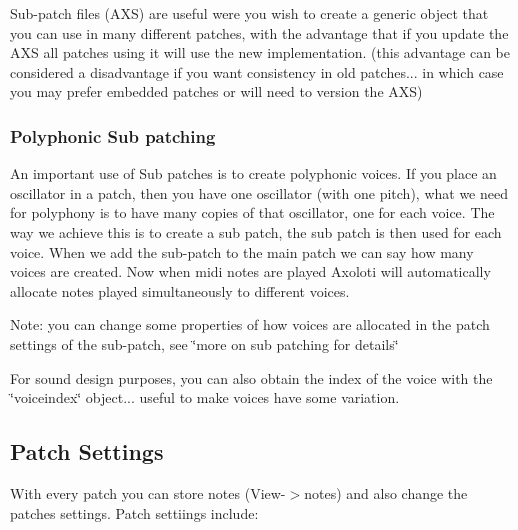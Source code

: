 Sub-\/patch files (A\+XS) are useful were you wish to create a generic object that you can use in many different patches, with the advantage that if you update the A\+XS all patches using it will use the new implementation. (this \textquotesingle{}advantage\textquotesingle{} can be considered a disadvantage if you want consistency in old patches... in which case you may prefer embedded patches or will need to version the A\+XS) \hypertarget{axo_gui_axo_gui_axoloti_edit_mode_patch_subpatch_poly}{}\subsubsection{Polyphonic Sub patching}\label{axo_gui_axo_gui_axoloti_edit_mode_patch_subpatch_poly}
An important use of Sub patches is to create polyphonic voices. If you place an oscillator in a patch, then you have one oscillator (with one pitch), what we need for polyphony is to have many copies of that oscillator, one for each voice. The way we achieve this is to create a sub patch, the sub patch is then used for each voice. When we add the sub-\/patch to the main patch we can say how many voices are created. Now when midi notes are played Axoloti will automatically allocate notes played simultaneously to different voices. 

Note\+: you can change some properties of how voices are allocated in the patch settings of the sub-\/patch, see \char`\"{}more on sub patching for details\char`\"{}

For sound design purposes, you can also obtain the index of the voice with the \char`\"{}voiceindex\char`\"{} object... useful to make voices have some variation.\hypertarget{axo_gui_axo_gui_axoloti_edit_mode_patch_settings}{}\subsection{Patch Settings}\label{axo_gui_axo_gui_axoloti_edit_mode_patch_settings}
With every patch you can store notes (View-\/$>$notes) and also change the patches settings. Patch settiings include\+:


